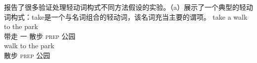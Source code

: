 \begin{exe}
\begin{xlist}[iv.]
\begin{exe}
\begin{xlist}[iv.]
 \citet*{WJKP2014a}报告了很多验证处理轻动词构式不同方法假设的实验。（a）展示了一个典型的轻动词构式：take是一个与名词组合的轻动词，该名词充当主要的谓项。
\eal
\ex 
\gll take a walk to the park\\
     带走 一 散步 \textsc{prep}  公园\\
\ex
\gll walk to the park\\
     散步 \textsc{prep}  公园\\
\zl


\end{xlist}
\end{exe}
\end{xlist}
\end{exe}
